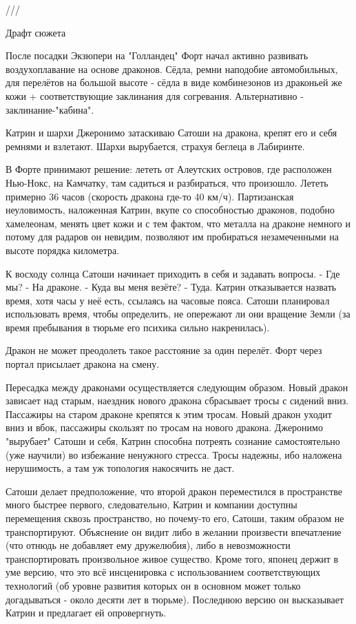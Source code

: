///{{ Драфт сюжета


После посадки Экзюпери на "Голландец" Форт начал активно развивать воздухоплавание на основе драконов.
Сёдла, ремни наподобие автомобильных, для перелётов на большой высоте - сёдла в виде комбинезонов из драконьей же кожи + соответствующие заклинания для согревания. Альтернативно - заклинание-"кабина".

Катрин и шархи Джеронимо затаскиваю Сатоши на дракона, крепят его и себя ремнями и взлетают. Шархи вырубается, страхуя беглеца в Лабиринте.

В Форте принимают решение: лететь от Алеутских островов, где расположен Нью-Нокс, на Камчатку, там садиться и разбираться, что произошло. Лететь примерно 36 часов (скорость дракона где-то 40 км/ч). Партизанская неуловимость, наложенная Катрин, вкупе со способностью драконов, подобно хамелеонам, менять цвет кожи и с тем фактом, что металла на драконе немного и потому для радаров он невидим, позволяют им пробираться незамеченными на высоте порядка километра.

К восходу солнца Сатоши начинает приходить в себя и задавать вопросы.
 - Где мы?
 - На драконе.
 - Куда вы меня везёте?
 - Туда.
Катрин отказывается назвать время, хотя часы у неё есть, ссылаясь на часовые пояса. Сатоши планировал использовать время, чтобы определить, не опережают ли они вращение Земли (за время пребывания в тюрьме его психика сильно накренилась).

Дракон не может преодолеть такое расстояние за один перелёт. Форт через портал присылает дракона на смену.

Пересадка между драконами осуществляется следующим образом.
Новый дракон зависает над старым, наездник нового дракона сбрасывает тросы с сидений вниз.
Пассажиры на старом драконе крепятся к этим тросам.
Новый дракон уходит вниз и вбок, пассажиры скользят по тросам на нового дракона.
Джеронимо "вырубает" Сатоши и себя, Катрин способна потреять сознание самостоятельно (уже научили) во избежание ненужного стресса.
Тросы надежны, ибо наложена нерушимость, а там уж топология накосячить не даст.

Сатоши делает предположение, что второй дракон переместился в пространстве много быстрее первого, следовательно, Катрин и компании доступны перемещения сквозь пространство, но почему-то его, Сатоши, таким образом не транспортируют. Объяснение он видит либо в желании произвести впечатление (что отнюдь не добавляет ему дружелюбия), либо в невозможности транспортировать произвольное живое существо.
Кроме того, японец держит в уме версию, что это всё инсценировка с использованием соответствующих технологий (об уровне развития которых он в основном может только догадываться - около десяти лет в тюрьме). Последнюю версию он высказывает Катрин и предлагает ей опровергнуть.

}}
